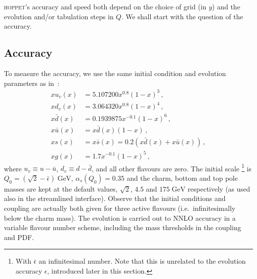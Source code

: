 \documentclass[12pt]{article}
\newcommand{\lp}{\left(}
\newcommand{\rp}{\right)}
\newcommand{\GeV}{\;\mathrm{GeV}}
\newcommand{\as}{\alpha_s}
\newcommand{\ie}{i.e.\ }
\newcommand{\hoppet}{\textsc{hoppet}\xspace}
\begin{document}
\hoppet's accuracy and speed both depend on the choice of grid (in
$y$) and the evolution and/or tabulation steps in $Q$. We shall start
with the question of the accuracy.


\subsection{Accuracy}
\label{sec:Accuracy}
To measure the accuracy, 
we use the same initial condition and evolution parameters as
in~\cite{Giele:2002hx,Dittmar:2005ed}:
\begin{subequations}
  \label{eq:init}
  \begin{align}
    x u_v(x)   &= 5.107200 x^{0.8} (1-x)^3\,,\\
    x d_v(x)   &= 3.064320 x^{0.8} (1-x)^4\,,\\
    x\bar d(x) &= 0.1939875 x^{-0.1} (1-x)^6\,,\\
    x\bar u(x) &= x\bar d(x) (1-x)\,,\\
    x     s(x) &= x\bar s(x) = 0.2(x\bar d(x) + x\bar u(x))\,,\\
    x g(x) &= 1.7 x^{-0.1} (1-x)^5\,,
  \end{align}
\end{subequations}
where $u_v \equiv u - \bar u$, $d_v \equiv d - \bar d$, and all other
flavours are zero. The initial scale%
\footnote{With $\bar{\epsilon}$ an infinitesimal number. Note that
this is unrelated to the evolution accuracy $\epsilon$, introduced later
in this section.} is $Q_0 = \lp \sqrt{2}-\bar{\epsilon}
\rp \GeV$,
$\as(Q_0) = 0.35$ and the charm, bottom and top pole masses are kept
at the default values, $\sqrt{2}$, $4.5$ and $175\GeV$ respectively
(as used also in the streamlined interface).
Observe that the initial conditions 
and coupling are actually both given for three active
flavours (\ie infinitesimally below the charm mass). The evolution is
carried out to NNLO accuracy in a variable flavour number scheme,
including the mass thresholds in the coupling and PDF.
\end{document}

